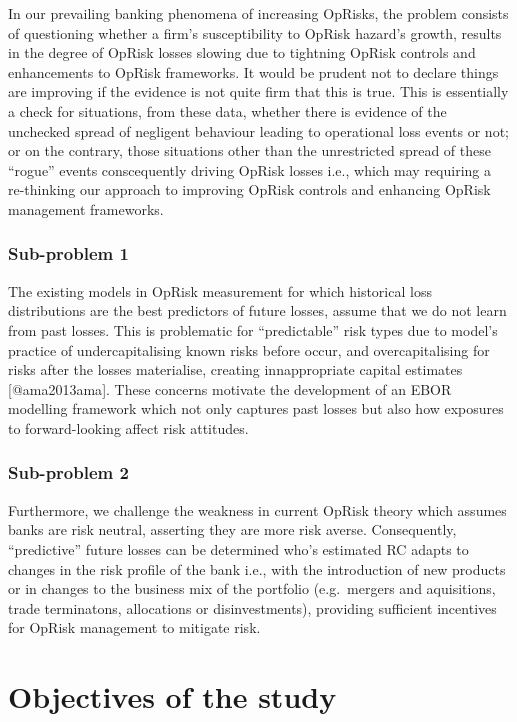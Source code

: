 \documentclass[
]{article}
\begin{document}
In our prevailing banking phenomena of increasing OpRisks, the problem
consists of questioning whether a firm's susceptibility to OpRisk
hazard's growth, results in the degree of OpRisk losses slowing due to
tightning OpRisk controls and enhancements to OpRisk frameworks. It
would be prudent not to declare things are improving if the evidence is
not quite firm that this is true. This is essentially a check for
situations, from these data, whether there is evidence of the unchecked
spread of negligent behaviour leading to operational loss events or not;
or on the contrary, those situations other than the unrestricted spread
of these ``rogue'' events conscequently driving OpRisk losses i.e.,
which may requiring a re-thinking our approach to improving OpRisk
controls and enhancing OpRisk management frameworks.

\subsubsection{Sub-problem 1}
\label{sssec:Sub-problem 1}

The existing models in OpRisk measurement for which historical loss
distributions are the best predictors of future losses, assume that we
do not learn from past losses. This is problematic for ``predictable''
risk types due to model's practice of undercapitalising known risks
before occur, and overcapitalising for risks after the losses
materialise, creating innappropriate capital estimates
{[}@ama2013ama{]}. These concerns motivate the development of an EBOR
modelling framework which not only captures past losses but also how
exposures to forward-looking affect risk attitudes.

\subsubsection{Sub-problem 2}
\label{sssec:Sub-problem 2}

Furthermore, we challenge the weakness in current OpRisk theory which
assumes banks are risk neutral, asserting they are more risk averse.
Consequently, ``predictive'' future losses can be determined who's
estimated RC adapts to changes in the risk profile of the bank i.e.,
with the introduction of new products or in changes to the business mix
of the portfolio (e.g.~mergers and aquisitions, trade terminatons,
allocations or disinvestments), providing sufficient incentives for
OpRisk management to mitigate risk.

\section{Objectives of the study}
\label{sec:Objectives of the study}
\end{document}
